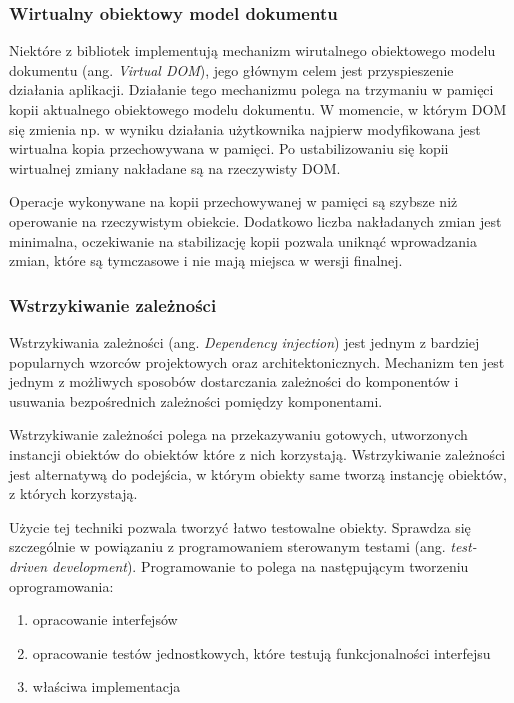 \documentclass[polish, twoside, 12pt]{mwart}
\begin{document}
\subsubsection{Wirtualny obiektowy model dokumentu}

Niektóre z bibliotek implementują mechanizm wirutalnego obiektowego modelu dokumentu (ang. \emph{ Virtual DOM}), jego głównym celem jest przyspieszenie działania aplikacji. Działanie tego mechanizmu polega na trzymaniu w pamięci kopii aktualnego obiektowego modelu dokumentu. W momencie, w którym DOM się zmienia np. w wyniku działania użytkownika najpierw modyfikowana jest wirtualna kopia przechowywana w pamięci. Po ustabilizowaniu się kopii wirtualnej zmiany nakładane są na rzeczywisty DOM.

Operacje wykonywane na kopii przechowywanej w pamięci są szybsze niż operowanie na rzeczywistym obiekcie. Dodatkowo liczba nakładanych zmian jest minimalna, oczekiwanie na stabilizację kopii pozwala uniknąć wprowadzania zmian, które są tymczasowe i nie mają miejsca w wersji finalnej.

\subsubsection{Wstrzykiwanie zależności}

Wstrzykiwania zależności (ang. \emph {Dependency injection}) jest jednym z bardziej popularnych wzorców projektowych oraz architektonicznych. Mechanizm ten jest jednym z możliwych sposobów dostarczania zależności do komponentów i usuwania bezpośrednich zależności pomiędzy komponentami.

Wstrzykiwanie zależności polega na przekazywaniu gotowych, utworzonych instancji obiektów do obiektów które z nich korzystają. Wstrzykiwanie zależności jest alternatywą do podejścia, w którym obiekty same tworzą instancję obiektów, z których korzystają. 

Użycie tej techniki pozwala tworzyć łatwo testowalne obiekty. Sprawdza się szczególnie w powiązaniu z programowaniem sterowanym testami (ang. \emph{test-driven development}). Programowanie to polega na następującym tworzeniu oprogramowania:

\begin{enumerate} 
  \item opracowanie interfejsów
  \item opracowanie testów jednostkowych, które testują funkcjonalności interfejsu
  \item właściwa implementacja
\end{enumerate}
\end{document}

